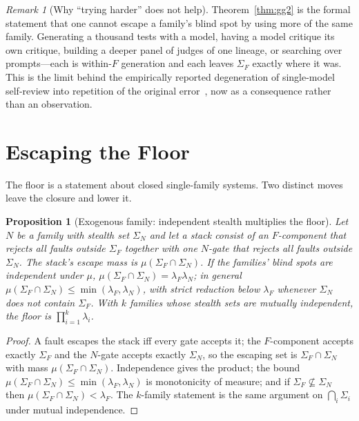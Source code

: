 \documentclass[11pt]{article}
\newtheorem{proposition}{Proposition}
\theoremstyle{definition}
\theoremstyle{remark}
\newtheorem{remark}{Remark}
\newcommand{\SigF}{\Sigma_{F}}
\newcommand{\SigN}{\Sigma_{N}}
\newcommand{\lF}{\lambda_{F}}
\newcommand{\lN}{\lambda_{N}}
\begin{document}
\begin{remark}[Why ``trying harder'' does not help]
Theorem~\ref{thm:gg2} is the formal statement that one cannot escape a family's blind spot by using
more of the same family. Generating a thousand tests with a model, having a model critique its own
critique, building a deeper panel of judges of one lineage, or searching over prompts---each is
within-$F$ generation and each leaves $\SigF$ exactly where it was. This is the limit behind the
empirically reported degeneration of single-model self-review into repetition of the original
error~\cite{homogenization2025,heteroteam2026}, now as a consequence rather than an observation.
\end{remark}

\section{Escaping the Floor}\label{sec:escape}

The floor is a statement about closed single-family systems. Two distinct moves leave the closure and
lower it.

\begin{proposition}[Exogenous family: independent stealth multiplies the floor]\label{prop:exo}
Let $N$ be a family with stealth set $\SigN$ and let a stack consist of an $F$-component that rejects
all faults outside $\SigF$ together with one $N$-gate that rejects all faults outside $\SigN$. The
stack's escape mass is $\mu(\SigF\cap\SigN)$. If the families' blind spots are independent under
$\mu$, $\mu(\SigF\cap\SigN)=\lF\lN$; in general $\mu(\SigF\cap\SigN)\le\min(\lF,\lN)$, with strict
reduction below $\lF$ whenever $\SigN$ does not contain $\SigF$. With $k$ families whose stealth sets
are mutually independent, the floor is $\prod_{i=1}^{k}\lambda_i$.
\end{proposition}

\begin{proof}
A fault escapes the stack iff every gate accepts it; the $F$-component accepts exactly $\SigF$ and the
$N$-gate accepts exactly $\SigN$, so the escaping set is $\SigF\cap\SigN$ with mass
$\mu(\SigF\cap\SigN)$. Independence gives the product; the bound
$\mu(\SigF\cap\SigN)\le\min(\lF,\lN)$ is monotonicity of measure; and if
$\SigF\not\subseteq\SigN$ then $\mu(\SigF\cap\SigN)<\lF$. The $k$-family statement is the same
argument on $\bigcap_i\Sigma_i$ under mutual independence.
\end{proof}
\end{document}
